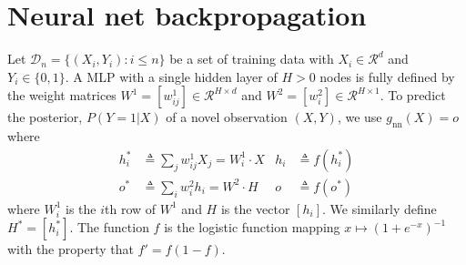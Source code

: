 \documentclass{article}
\begin{document}
\newcommand\gnn{\ensuremath{g_{\mathrm{nn}}}}
\newcommand{\pnorm}[2]{\ensuremath{\vert\vert #2 \vert\vert_{#1}}}
\newcommand\twonorm[1]{\pnorm{2}{#1}}


\section{Neural net backpropagation}
\label{sec:backprop}

Let $\mathcal{D}_n = \{(X_i, Y_i) : i \le n\}$ be a set of training
data with $X_i \in \mathcal{R}^d$ and $Y_i \in \{0, 1\}$. A MLP with a
single hidden layer of $H > 0$ nodes is fully defined by the weight
matrices $W^1 = [w^1_{ij}] \in \mathcal{R}^{H \times d}$ and $W^2 =
[w_i^2] \in \mathcal{R}^{H \times 1}$. To predict the posterior, $P(Y
= 1| X)$ of a novel observation $(X, Y)$, we use $\gnn(X) = o$ where
\begin{align}
  h_i^* &\triangleq \sum_j w^1_{ij} X_j = W_i^1 \cdot X &   h_i &\triangleq f(h_i^*) \\
  o^* &\triangleq \sum_i w^2_i h_i = W^2 \cdot H &   o &\triangleq f(o^*)
\end{align}
where $W_i^1$ is the $i$th row of $W^1$ and $H$ is the vector
$[h_i]$. We similarly define $H^* = [h^*_i]$. The function $f$ is the
logistic function mapping $x \mapsto (1+e^{-x})^{-1}$ with the
property that $f' = f(1-f)$.
\end{document}
